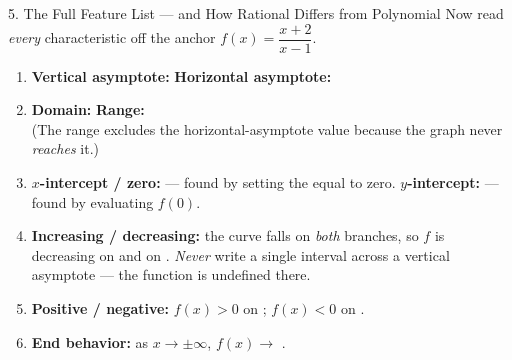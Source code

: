 \documentclass[10pt]{article}
\newcommand{\lgrid}[4]{%
  \draw[step=1, linegray!40, very thin] (#1,#3) grid (#2,#4);
  \draw[->, semithick, charcoal] (#1,0)--(#2,0) node[below right, font=\scriptsize]{$x$};
  \draw[->, semithick, charcoal] (0,#3)--(0,#4) node[left, font=\scriptsize]{$y$};}
\begin{document}
\begin{notesbox}{5. The Full Feature List --- and How Rational Differs from Polynomial}
Now read \emph{every} characteristic off the anchor $f(x)=\dfrac{x+2}{x-1}$.
\begin{center}
\end{center}
\begin{enumerate}[leftmargin=1.7em, itemsep=3pt]
  \item \textbf{Vertical asymptote:}  \quad \textbf{Horizontal asymptote:}
  \item \textbf{Domain:}  \quad \textbf{Range:}
         \\
        (The range excludes the horizontal-asymptote value because the graph never \emph{reaches}
        it.)
  \item \textbf{$x$-intercept / zero:}  --- found by setting the  equal to
        zero. \quad \textbf{$y$-intercept:}  --- found by evaluating $f(0)$.
  \item \textbf{Increasing / decreasing:} the curve falls on \emph{both} branches, so $f$ is
        decreasing on  and on . \emph{Never} write a single interval
        across a vertical asymptote --- the function is undefined there.
  \item \textbf{Positive / negative:} $f(x)>0$ on ; \quad $f(x)<0$ on
        .
  \item \textbf{End behavior:} as $x\to\pm\infty$, $f(x)\to$ .
\end{enumerate}


\end{notesbox}
\end{document}

